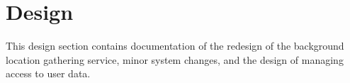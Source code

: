 \section{Design}
This design section contains documentation of the redesign of the background location gathering service, minor system changes, and the design of managing access to user data.





